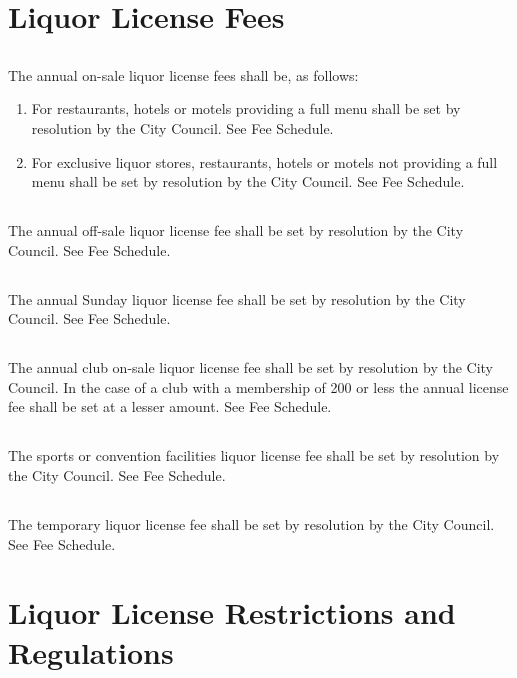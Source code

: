 \section{Liquor License Fees}
\subsection{}
The annual on-sale liquor license fees shall be, as follows:
\begin{enumerate}[{\indent}1)]
    \item For restaurants, hotels or motels providing a full menu shall be set by resolution by the City Council. See Fee Schedule.
    \item For exclusive liquor stores, restaurants, hotels or motels not providing a full menu shall be set by resolution by the City Council. See Fee Schedule.
\end{enumerate}
\subsection{}
The annual off-sale liquor license fee shall be set by resolution by the City Council. See Fee Schedule.
\subsection{}
The annual Sunday liquor license fee shall be set by resolution by the City Council. See Fee Schedule.
\subsection{}
The annual club on-sale liquor license fee shall be set by resolution by the City Council. In the case of a club with a membership of 200 or less the annual license fee shall be set at a lesser amount. See Fee Schedule.
\subsection{}
The sports or convention facilities liquor license fee shall be set by resolution by the City Council. See Fee Schedule.
\subsection{}
The temporary liquor license fee shall be set by resolution by the City Council. See Fee Schedule.

\section{Liquor License Restrictions and Regulations}
